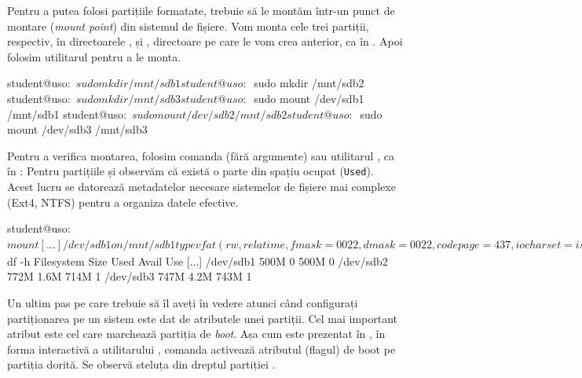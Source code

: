 Pentru a putea folosi partițiile formatate, trebuie să le montăm într-un punct de montare (\textit{mount point}) din sistemul de fișiere.
Vom monta cele trei partiții, respectiv, în directoarele ,  și , directoare pe care le vom crea anterior, ca în .
Apoi folosim utilitarul  pentru a le monta.

\begin{screen}[caption={Montarea partițiilor},label={lst:storage:mount}]
student@uso:~$ sudo mkdir /mnt/sdb1
student@uso:~$ sudo mkdir /mnt/sdb2
student@uso:~$ sudo mkdir /mnt/sdb3
student@uso:~$ sudo mount /dev/sdb1 /mnt/sdb1
student@uso:~$ sudo mount /dev/sdb2 /mnt/sdb2
student@uso:~$ sudo mount /dev/sdb3 /mnt/sdb3
\end{screen}

Pentru a verifica montarea, folosim comanda  (fără argumente) sau utilitarul , ca în :
Pentru partițiile  și  observăm că există o parte din spațiu ocupat (\texttt{Used}).
Acest lucru se datorează metadatelor necesare sistemelor de fișiere mai complexe (Ext4, NTFS) pentru a organiza datele efective.

\begin{screen}[caption={Afișarea partițiilor montate},label={lst:storage:list-mounts}]
student@uso:~$ mount
[...]
/dev/sdb1 on /mnt/sdb1 type vfat (rw,relatime,fmask=0022,dmask=0022,codepage=437,iocharset=iso8859-1,shortname=mixed,errors=remount-ro)
/dev/sdb2 on /mnt/sdb2 type ext4 (rw,relatime,data=ordered)
/dev/sdb3 on /mnt/sdb3 type fuseblk (rw,relatime,user_id=0,group_id=0,allow_other,blksize=4096)
student@uso:~$ df -h
Filesystem      Size  Used Avail Use%
[...]
/dev/sdb1       500M     0  500M   0%
/dev/sdb2       772M  1.6M  714M   1%
/dev/sdb3       747M  4.2M  743M   1%
\end{screen}

Un ultim pas pe care trebuie să îl aveți în vedere atunci când configurați partiționarea pe un sistem este dat de atributele unei partiții.
 Cel mai important atribut este cel care marchează partiția de \textit{boot}.
 Așa cum este prezentat în , în forma interactivă a utilitarului , comanda  activează atributul (flagul) de boot pe partiția dorită.
Se observă steluța din dreptul partiției .

